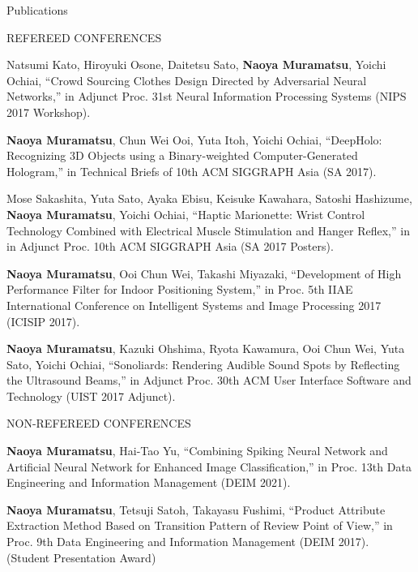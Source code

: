 \documentclass{resume} %
\begin{document}
\begin{rSection}{Publications}
\begin{rSubsection}{REFEREED CONFERENCES}{}{}{}{}
        \item Natsumi Kato, Hiroyuki Osone, Daitetsu Sato, \textbf{Naoya Muramatsu}, Yoichi Ochiai, ``Crowd Sourcing Clothes Design Directed by Adversarial Neural Networks,'' in  Adjunct Proc. 31st Neural Information Processing Systems (NIPS 2017 Workshop).
        \item \textbf{Naoya Muramatsu}, Chun Wei Ooi, Yuta Itoh, Yoichi Ochiai, ``DeepHolo: Recognizing 3D Objects using a Binary-weighted Computer-Generated Hologram,'' in Technical Briefs of 10th ACM SIGGRAPH Asia (SA 2017).
        \item Mose Sakashita, Yuta Sato, Ayaka Ebisu, Keisuke Kawahara, Satoshi Hashizume, \textbf{Naoya Muramatsu}, Yoichi Ochiai, ``Haptic Marionette: Wrist Control Technology Combined with Electrical Muscle Stimulation and Hanger Reflex,'' in in Adjunct Proc. 10th ACM SIGGRAPH Asia (SA 2017 Posters).
        \item \textbf{Naoya Muramatsu}, Ooi Chun Wei, Takashi Miyazaki, ``Development of High Performance Filter for Indoor Positioning System,'' in Proc. 5th IIAE International Conference on Intelligent Systems and Image Processing 2017 (ICISIP 2017).
        \item \textbf{Naoya Muramatsu}, Kazuki Ohshima, Ryota Kawamura, Ooi Chun Wei, Yuta Sato, Yoichi Ochiai, ``Sonoliards: Rendering Audible Sound Spots by Reflecting the Ultrasound Beams,'' in Adjunct Proc. 30th ACM User Interface Software and Technology (UIST 2017 Adjunct).
    \end{rSubsection}




    \begin{rSubsection}{NON-REFEREED CONFERENCES}{}{}{}{}
        \item \textbf{Naoya Muramatsu}, Hai-Tao Yu, ``Combining Spiking Neural Network and Artificial Neural Network for Enhanced Image Classification,'' in Proc. 13th Data Engineering and Information Management (DEIM 2021).
        \item \textbf{Naoya Muramatsu}, Tetsuji Satoh, Takayasu Fushimi, ``Product Attribute Extraction Method Based on Transition Pattern of Review Point of View,'' in Proc. 9th Data Engineering and Information Management (DEIM 2017). (Student Presentation Award) %
    \end{rSubsection}

\end{rSection}
\end{document}
